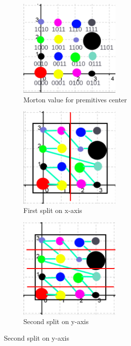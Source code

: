\documentclass[11pt,a4paper]{article}
\begin{document}
\begin{figure}[H]	
     \centering
     \begin{subfigure}[b]{0.475\textwidth}
         \centering
         \captionsetup{justification=centering}
         \includegraphics[width=5cm]{images/example_lbvh/scene_2.png}
         \caption{Morton value for premitives center}
         \label{fig:pi_4000}
     \end{subfigure}
     \hfill
     \begin{subfigure}[b]{0.475\textwidth}
         \centering
         \captionsetup{justification=centering}
         \includegraphics[width=5cm]{images/example_lbvh/02.png}
         \caption{First split on x-axis}
         \label{fig:pi_5000}
     \end{subfigure}
     \hfill
     \begin{subfigure}[b]{0.475\textwidth}
         \centering
         \captionsetup{justification=centering}
         \includegraphics[width=5cm]{images/example_lbvh/03.png}
         \caption{Second split on y-axis}
         \label{fig:pi_18000}

\end{subfigure}
\end{figure}
\end{document}
